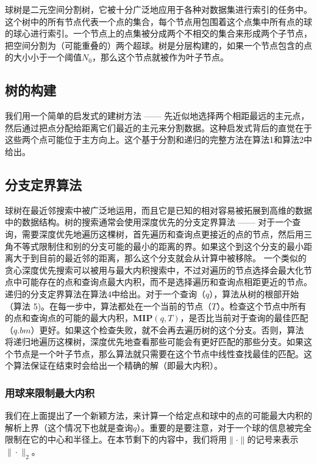\documentclass[twocolumn,a4paper]{article}
\begin{document}
球树\cite{29, 28}是二元空间分割树，它被十分广泛地应用于各种对数据集进行索引的任务中。这个树中的所有节点代表一个点的集合，每个节点用包围着这个点集中所有点的球的球心进行索引。一个节点上的点集被分成两个不相交的集合来形成两个子节点，把空间分割为（可能重叠的）两个超球。树是分层构建的，如果一个节点包含的点的大小小于一个阈值$N_0$，那么这个节点就被作为叶子节点。

\subsection{树的构建}

我们用一个简单的启发式的建树方法 ------ 先近似地选择两个相距最远\cite{28}的主元点，然后通过把点分配给距离它们最近的主元来分割数据。这种启发式背后的直觉在于这些两个点可能位于主方向上。这个基于分割和递归的完整方法在算法1和算法2中给出。

\subsection{分支定界算法}

球树在最近邻搜索中被广泛地运用，而且它是已知的相对容易被拓展到高维\cite{28, 26}的数据中的数据结构。树的搜索通常会使用深度优先的分支定界算法 ------ 对于一个查询，需要深度优先地遍历这棵树，首先遍历和查询点更接近的点的节点，然后用三角不等式限制住和别的分支可能的最小的距离的界。如果这个到这个分支的最小距离大于到目前的最近邻的距离，那么这个分支就会从计算中被移除。
一个类似的贪心深度优先搜索可以被用与最大内积搜索中，不过对遍历的节点选择会最大化节点中可能存在的点和查询点最大内积，而不是选择遍历和查询点相距更近的节点。递归的分支定界算法在算法4中给出。对于一个查询（$q$），算法从树的根部开始（算法 5)。在每一步中，算法都处在一个当前的节点（$T$）。检查这个节点中所有的点和查询点的可能的最大内积，$\mathbf{MIP}(q,T)$，是否比当前对于查询的最佳匹配（$q.bm$）更好。如果这个检查失败，就不会再去遍历树的这个分支。否则，算法将递归地遍历这棵树，深度优先地查看那些可能会有更好匹配的那些分支。如果这个节点是一个叶子节点，那么算法就只需要在这个节点中线性查找最佳的匹配。这个算法保证在结束时会给出一个精确的解（即最大内积）。

\subsubsection{用球来限制最大内积}

我们在上面提出了一个新颖方法，来计算一个给定点和球中的点的可能最大内积的解析上界（这个情况下也就是查询$q$）。重要的是要注意，对于一个球的信息被完全限制在它的中心和半径上。在本节剩下的内容中，我们将用$\|\cdot\|$的记号来表示$\|\cdot\|_2$。
\end{document}
